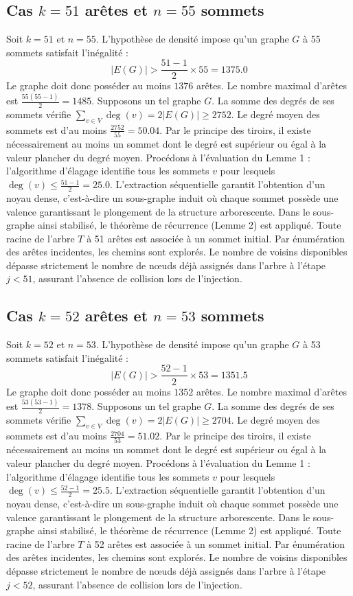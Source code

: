 \documentclass[12pt,a4paper]{article}
\begin{document}
\subsection{Cas $k = 51$ arêtes et $n = 55$ sommets}
Soit $k = 51$ et $n = 55$. L'hypothèse de densité impose qu'un graphe $G$ à 55 sommets satisfait l'inégalité :
$$ |E(G)| > \frac{51-1}{2} \times 55 = 1375.0 $$
Le graphe doit donc posséder au moins $1376$ arêtes. Le nombre maximal d'arêtes est $\frac{55(55-1)}{2} = 1485$.
Supposons un tel graphe $G$. La somme des degrés de ses sommets vérifie $\sum_{v \in V} \deg(v) = 2|E(G)| \geq 2752$.
Le degré moyen des sommets est d'au moins $\frac{2752}{55} = 50.04$.
Par le principe des tiroirs, il existe nécessairement au moins un sommet dont le degré est supérieur ou égal à la valeur plancher du degré moyen.
Procédons à l'évaluation du Lemme 1 : l'algorithme d'élagage identifie tous les sommets $v$ pour lesquels $\deg(v) \leq \frac{51-1}{2} = 25.0$.
L'extraction séquentielle garantit l'obtention d'un noyau dense, c'est-à-dire un sous-graphe induit où chaque sommet possède une valence garantissant le plongement de la structure arborescente.
Dans le sous-graphe ainsi stabilisé, le théorème de récurrence (Lemme 2) est appliqué. Toute racine de l'arbre $T$ à 51 arêtes est associée à un sommet initial. Par énumération des arêtes incidentes, les chemins sont explorés. Le nombre de voisins disponibles dépasse strictement le nombre de nœuds déjà assignés dans l'arbre à l'étape $j < 51$, assurant l'absence de collision lors de l'injection.

\subsection{Cas $k = 52$ arêtes et $n = 53$ sommets}
Soit $k = 52$ et $n = 53$. L'hypothèse de densité impose qu'un graphe $G$ à 53 sommets satisfait l'inégalité :
$$ |E(G)| > \frac{52-1}{2} \times 53 = 1351.5 $$
Le graphe doit donc posséder au moins $1352$ arêtes. Le nombre maximal d'arêtes est $\frac{53(53-1)}{2} = 1378$.
Supposons un tel graphe $G$. La somme des degrés de ses sommets vérifie $\sum_{v \in V} \deg(v) = 2|E(G)| \geq 2704$.
Le degré moyen des sommets est d'au moins $\frac{2704}{53} = 51.02$.
Par le principe des tiroirs, il existe nécessairement au moins un sommet dont le degré est supérieur ou égal à la valeur plancher du degré moyen.
Procédons à l'évaluation du Lemme 1 : l'algorithme d'élagage identifie tous les sommets $v$ pour lesquels $\deg(v) \leq \frac{52-1}{2} = 25.5$.
L'extraction séquentielle garantit l'obtention d'un noyau dense, c'est-à-dire un sous-graphe induit où chaque sommet possède une valence garantissant le plongement de la structure arborescente.
Dans le sous-graphe ainsi stabilisé, le théorème de récurrence (Lemme 2) est appliqué. Toute racine de l'arbre $T$ à 52 arêtes est associée à un sommet initial. Par énumération des arêtes incidentes, les chemins sont explorés. Le nombre de voisins disponibles dépasse strictement le nombre de nœuds déjà assignés dans l'arbre à l'étape $j < 52$, assurant l'absence de collision lors de l'injection.
\end{document}

